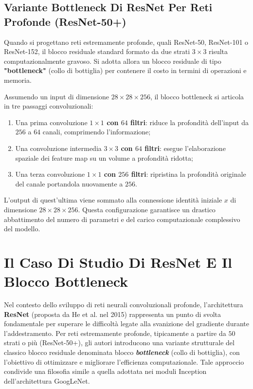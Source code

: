 ﻿\documentclass[11pt, a4paper]{article}
\begin{document}
\subsection{Variante Bottleneck Di ResNet Per Reti Profonde (ResNet-50+)}

Quando si progettano reti estremamente profonde, quali ResNet-50, ResNet-101 o ResNet-152, il blocco residuale standard formato da due strati $3\times3$ risulta computazionalmente gravoso. Si adotta allora un blocco residuale di tipo \textbf{"bottleneck"} (collo di bottiglia) per contenere il costo in termini di operazioni e memoria.

Assumendo un input di dimensione $28\times28\times256$, il blocco bottleneck si articola in tre passaggi convoluzionali:
\begin{enumerate}
    \item Una prima convoluzione \textbf{$1\times1$ con $64$ filtri}: riduce la profondità dell'input da $256$ a $64$ canali, comprimendo l'informazione;
    \item Una convoluzione intermedia \textbf{$3\times3$ con $64$ filtri}: esegue l'elaborazione spaziale dei feature map su un volume a profondità ridotta;
    \item Una terza convoluzione \textbf{$1\times1$ con $256$ filtri}: ripristina la profondità originale del canale portandola nuovamente a $256$.
\end{enumerate}
L'output di quest'ultima viene sommato alla connessione identità iniziale $x$ di dimensione $28\times28\times256$. Questa configurazione garantisce un drastico abbattimento del numero di parametri e del carico computazionale complessivo del modello.


\section{Il Caso Di Studio Di ResNet E Il Blocco Bottleneck}

Nel contesto dello sviluppo di reti neurali convoluzionali profonde, l'architettura \textbf{ResNet} (proposta da He et al. nel 2015) rappresenta un punto di svolta fondamentale per superare le difficoltà legate alla svanizione del gradiente durante l'addestramento. Per reti estremamente profonde, tipicamente a partire da $50$ strati o più (ResNet-50+), gli autori introducono una variante strutturale del classico blocco residuale denominata blocco \textbf{\emph{bottleneck}} (collo di bottiglia), con l'obiettivo di ottimizzare e migliorare l'efficienza computazionale. Tale approccio condivide una filosofia simile a quella adottata nei moduli Inception dell'architettura GoogLeNet.
\end{document}
